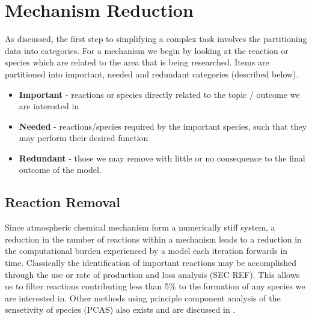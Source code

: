 
\section{Mechanism Reduction}







%
%
%

As discussed, the first step to simplifying a complex task involves the partitioning data into categories. For a mechanism we begin by looking at the reaction or species which are related to the area that is being researched. Items are partitioned into important, needed and redundant categories (described below). 

\begin{itemize}
    \item \textbf{Important} - reactions or species directly related to the topic / outcome we are interested in
    \item \textbf{Needed} - reactions/species required by the important species, such that they may perform their desired function
    \item \textbf{Redundant} - those we may remove with little or no consequence to the final outcome of the model. 
\end{itemize}



\subsection{Reaction Removal}
Since atmospheric chemical mechanism form a numerically stiff system, a reduction in the number of reactions within a mechanism leads to a reduction in the computational burden experienced by a model each iteration forwards in time. Classically the identification of important reactions may be accomplished through the use or rate of production and loss analysis (SEC REF). This allows us to filter reactions contributing less than 5\% to the formation of any species we are interested in. Other methods using principle component analysis of the sensetivity of species (PCAS) also exists and are discussed in \cite{PCAS}.


